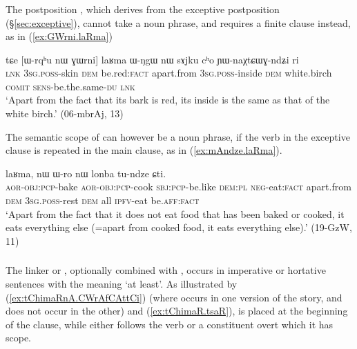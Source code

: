 \subsubsection{}
The postposition , which derives from the exceptive postposition  (§\ref{sec:exceptive}), cannot take a noun phrase, and requires a finite clause instead, as in (\ref{ex:GWrni.laRma})

\begin{exe}
\ex \label{ex:GWrni.laRma}
\gll tɕe [ɯ-rqʰu nɯ ɣɯrni] laʁma ɯ-ŋgɯ nɯ sɤjku cʰo ɲɯ-naχtɕɯɣ-ndʑi ri \\
\textsc{lnk} \textsc{3sg}.\textsc{poss}-skin \textsc{dem} be.red:\textsc{fact} apart.from \textsc{3sg}.\textsc{poss}-inside \textsc{dem} white.birch \textsc{comit} \textsc{sens}-be.the.same-\textsc{du} \textsc{lnk} \\
\glt `Apart from the fact that its bark is red, its inside is the same as that of the white birch.' (06-mbrAj, 13)
\end{exe} 

The semantic scope of  can however be a noun phrase, if the verb in the exceptive clause is repeated in the main clause, as in (\ref{ex:mAndze.laRma}).

\begin{exe}
\ex \label{ex:mAndze.laRma}
 laʁma, nɯ ɯ-ro nɯ lonba tu-ndze ɕti. \\
\textsc{aor}-\textsc{obj}:\textsc{pcp}-bake \textsc{aor}-\textsc{obj}:\textsc{pcp}-cook  \textsc{sbj}:\textsc{pcp}-be.like \textsc{dem}:\textsc{pl} \textsc{neg}-eat:\textsc{fact} apart.from \textsc{dem} \textsc{3sg}.\textsc{poss}-rest \textsc{dem} all \textsc{ipfv}-eat be.\textsc{aff}:\textsc{fact} \\
\glt `Apart from the fact that it does not eat food that has been baked or cooked, it eats everything else (=apart from cooked food, it eats everything else).' (19-GzW, 11)
\end{exe} 

\subsubsection{}
The linker  or , optionally combined with , occurs in imperative or hortative sentences with the meaning `at least'. As illustrated by (\ref{ex:tChimaRnA.CWrAfCAttCi}) (where  occurs in one version of the story, and does not occur in the other) and (\ref{ex:tChimaR.tsaR}),  is placed at the beginning of the clause, while  either follows the verb or a constituent overt which it has scope.

